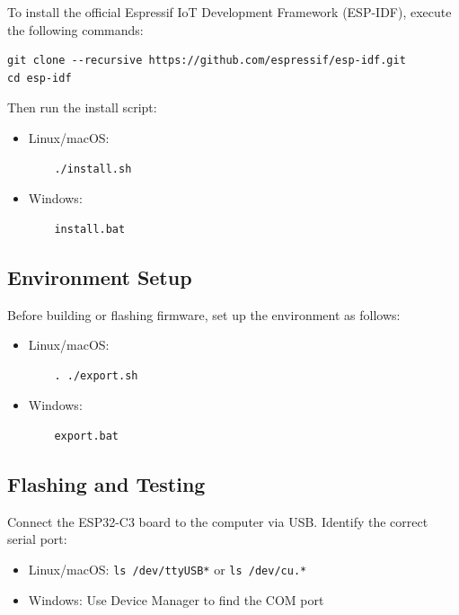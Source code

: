 \documentclass[conference]{IEEEtran}
\begin{document}
To install the official Espressif IoT Development Framework (ESP-IDF), execute the following commands:

\begin{lstlisting}
git clone --recursive https://github.com/espressif/esp-idf.git
cd esp-idf
\end{lstlisting}

Then run the install script:

\begin{itemize}
    \item Linux/macOS:
    \begin{lstlisting}
    ./install.sh
    \end{lstlisting}
    \item Windows:
    \begin{lstlisting}
    install.bat
    \end{lstlisting}
\end{itemize}

\subsection{Environment Setup}

Before building or flashing firmware, set up the environment as follows:

\begin{itemize}
    \item Linux/macOS:
    \begin{lstlisting}
    . ./export.sh
    \end{lstlisting}
    \item Windows:
    \begin{lstlisting}
    export.bat
    \end{lstlisting}
\end{itemize}

\subsection{Flashing and Testing}

Connect the ESP32-C3 board to the computer via USB. Identify the correct serial port:

\begin{itemize}
    \item Linux/macOS: \texttt{ls /dev/ttyUSB*} or \texttt{ls /dev/cu.*}
    \item Windows: Use Device Manager to find the COM port
\end{itemize}
\end{document}
